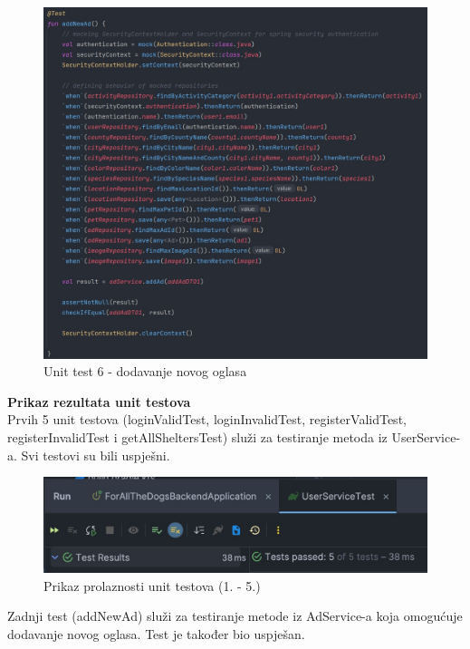 		\begin{figure}[H]
			\includegraphics[scale=0.5]{slike/unit6.PNG} 
			\centering
			\caption{Unit test 6 - dodavanje novog oglasa}
			\label{unit6}
		\end{figure}

\pagebreak
		
\textbf{Prikaz rezultata unit testova}\\

Prvih 5 unit testova (loginValidTest, loginInvalidTest, registerValidTest, registerInvalidTest i getAllSheltersTest) služi za testiranje metoda iz UserService-a. Svi testovi su bili uspješni.

		\begin{figure}[H]
			\includegraphics[scale=0.45]{slike/5unitrez.PNG} 
			\centering
			\caption{Prikaz prolaznosti unit testova (1. - 5.)}
			\label{5unitrez}
		\end{figure}
		
		
Zadnji test (addNewAd) služi za testiranje metode iz AdService-a koja omogućuje dodavanje novog oglasa. Test je također bio uspješan.

